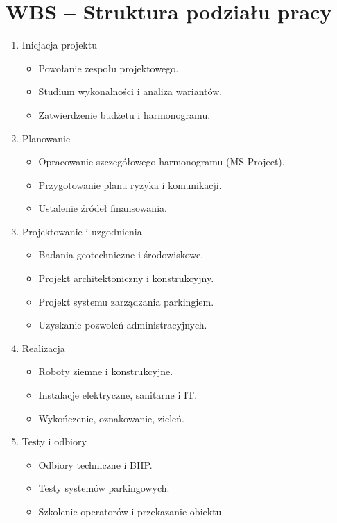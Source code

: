 \documentclass[a4paper,12pt]{article}
\begin{document}
\section{WBS -- Struktura podziału pracy}
\begin{enumerate}
    \item Inicjacja projektu
    \begin{itemize}
        \item Powołanie zespołu projektowego.
        \item Studium wykonalności i analiza wariantów.
        \item Zatwierdzenie budżetu i harmonogramu.
    \end{itemize}
    \item Planowanie
    \begin{itemize}
        \item Opracowanie szczegółowego harmonogramu (MS Project).
        \item Przygotowanie planu ryzyka i komunikacji.
        \item Ustalenie źródeł finansowania.
    \end{itemize}
    \item Projektowanie i uzgodnienia
    \begin{itemize}
        \item Badania geotechniczne i środowiskowe.
        \item Projekt architektoniczny i konstrukcyjny.
        \item Projekt systemu zarządzania parkingiem.
        \item Uzyskanie pozwoleń administracyjnych.
    \end{itemize}
    \item Realizacja
    \begin{itemize}
        \item Roboty ziemne i konstrukcyjne.
        \item Instalacje elektryczne, sanitarne i IT.
        \item Wykończenie, oznakowanie, zieleń.
    \end{itemize}
    \item Testy i odbiory
    \begin{itemize}
        \item Odbiory techniczne i BHP.
        \item Testy systemów parkingowych.
        \item Szkolenie operatorów i przekazanie obiektu.
    \end{itemize}
\end{enumerate}
\end{document}
